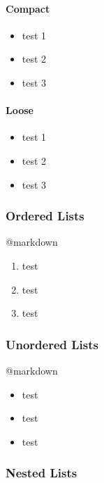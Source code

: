 \documentclass[]{article}
\providecommand{\tightlist}{%
  \setlength{\itemsep}{0pt}\setlength{\parskip}{0pt}}
\let\oldparagraph\paragraph
\renewcommand{\paragraph}[1]{\oldparagraph{#1}\mbox{}}
\begin{document}
\paragraph{Compact}\label{compact}

\begin{itemize}
\tightlist
\item
  test 1
\item
  test 2
\item
  test 3
\end{itemize}

\paragraph{Loose}\label{loose}

\begin{itemize}
\item
  test 1
\item
  test 2
\item
  test 3
\end{itemize}

\subsubsection{Ordered Lists}\label{ordered-lists}

@markdown

\begin{enumerate}
\def\labelenumi{\arabic{enumi}.}
\tightlist
\item
  test
\item
  test
\item
  test
\end{enumerate}

\subsubsection{Unordered Lists}\label{unordered-lists}

@markdown

\begin{itemize}
\tightlist
\item
  test
\item
  test
\item
  test
\end{itemize}

\subsubsection{Nested Lists}\label{nested-lists}
\end{document}
